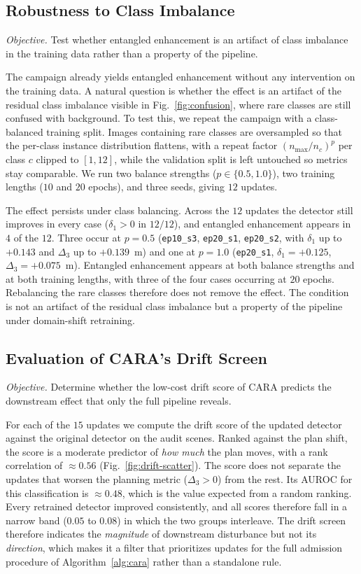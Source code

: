 \documentclass[conference]{IEEEtran}
\begin{document}
\subsection{Robustness to Class Imbalance}
\label{sec:res-balanced}
\emph{Objective.} Test whether entangled enhancement is an artifact of class
imbalance in the training data rather than a property of the pipeline.

The campaign already yields entangled enhancement without any intervention on the
training data. A natural question is whether the effect is an artifact of the
residual class imbalance visible in Fig.~\ref{fig:confusion}, where rare classes
are still confused with background. To test this, we repeat the campaign with a
class-balanced training split. Images containing rare classes are oversampled so
that the per-class instance distribution flattens, with a repeat factor
$(n_{\max}/n_c)^{p}$ per class $c$ clipped to
$[1,12]$, while the validation split is left untouched so metrics stay comparable.
We run two balance strengths ($p \in \{0.5, 1.0\}$), two training lengths
($10$ and $20$ epochs), and three seeds, giving $12$ updates.

The effect persists under class balancing. Across the $12$ updates the
detector still improves in every case ($\delta_1 > 0$ in $12/12$), and entangled
enhancement appears in $4$ of the $12$. Three occur at $p{=}0.5$
(\texttt{ep10\_s3}, \texttt{ep20\_s1}, \texttt{ep20\_s2}, with $\delta_1$ up to
$+0.143$ and $\Delta_3$ up to $+0.139$~m) and one at $p{=}1.0$
(\texttt{ep20\_s1}, $\delta_1{=}+0.125$, $\Delta_3{=}+0.075$~m). Entangled enhancement appears at
both balance strengths and at both training lengths, with three of the four cases
occurring at $20$ epochs. Rebalancing the rare classes therefore does not remove
the effect. The condition is
not an artifact of the residual class imbalance but a property of the pipeline
under domain-shift retraining.

\subsection{Evaluation of CARA's Drift Screen}
\label{sec:res-gate}
\emph{Objective.} Determine whether the low-cost drift score of CARA
predicts the downstream effect that only the full pipeline reveals.

For each of the $15$ updates we compute the drift score of the updated detector
against the original detector on the audit scenes. Ranked against the plan shift,
the score is a moderate predictor of \emph{how much} the plan moves, with a rank
correlation of $\approx 0.56$ (Fig.~\ref{fig:drift-scatter}). The score does not
separate the updates that worsen the planning metric ($\Delta_3 > 0$) from the
rest. Its AUROC for this classification is $\approx 0.48$, which is the value
expected from a random ranking. Every retrained detector improved
consistently, and all scores therefore fall in a narrow band ($0.05$ to $0.08$) in which the two
groups interleave. The drift screen therefore indicates the \emph{magnitude} of
downstream disturbance but not its \emph{direction}, which makes it a filter that
prioritizes updates for the full admission procedure of
Algorithm~\ref{alg:cara} rather than a standalone rule.
\end{document}
